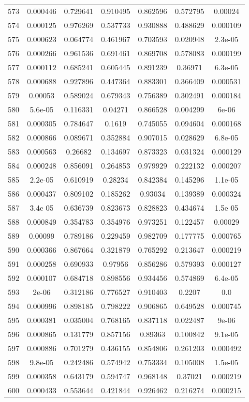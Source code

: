 \begin{table}
\begin{tabular}{c|c|c|c|c|c|c}
573 & 0.000446 & 0.729641 & 0.910495 & 0.862596 & 0.572795 & 0.00024\\
574 & 0.000125 & 0.976269 & 0.537733 & 0.930888 & 0.488629 & 0.000109\\
575 & 0.000623 & 0.064774 & 0.461967 & 0.703593 & 0.020948 & 2.3e-05\\
576 & 0.000266 & 0.961536 & 0.691461 & 0.869708 & 0.578083 & 0.000199\\
577 & 0.000112 & 0.685241 & 0.605445 & 0.891239 & 0.36971 & 6.3e-05\\
578 & 0.000688 & 0.927896 & 0.447364 & 0.883301 & 0.366409 & 0.000531\\
579 & 0.00053 & 0.589024 & 0.679343 & 0.756389 & 0.302491 & 0.000184\\
580 & 5.6e-05 & 0.116331 & 0.04271 & 0.866528 & 0.004299 & 6e-06\\
581 & 0.000305 & 0.784647 & 0.1619 & 0.745055 & 0.094604 & 0.000168\\
582 & 0.000866 & 0.089671 & 0.352884 & 0.907015 & 0.028629 & 6.8e-05\\
583 & 0.000563 & 0.26682 & 0.134697 & 0.873323 & 0.031324 & 0.000129\\
584 & 0.000248 & 0.856091 & 0.264853 & 0.979929 & 0.222132 & 0.000207\\
585 & 2.2e-05 & 0.610919 & 0.28234 & 0.842384 & 0.145296 & 1.1e-05\\
586 & 0.000437 & 0.809102 & 0.185262 & 0.93034 & 0.139389 & 0.000324\\
587 & 3.4e-05 & 0.636739 & 0.823673 & 0.828823 & 0.434674 & 1.5e-05\\
588 & 0.000849 & 0.354783 & 0.354976 & 0.973251 & 0.122457 & 0.00029\\
589 & 0.00099 & 0.789186 & 0.229459 & 0.982709 & 0.177775 & 0.000765\\
590 & 0.000366 & 0.867664 & 0.321879 & 0.765292 & 0.213647 & 0.000219\\
591 & 0.000258 & 0.690933 & 0.97956 & 0.856286 & 0.579393 & 0.000127\\
592 & 0.000107 & 0.684718 & 0.898556 & 0.934456 & 0.574869 & 6.4e-05\\
593 & 2e-06 & 0.312186 & 0.776527 & 0.910403 & 0.2207 & 0.0\\
594 & 0.000996 & 0.898185 & 0.798222 & 0.906865 & 0.649528 & 0.000745\\
595 & 0.000381 & 0.035004 & 0.768165 & 0.837118 & 0.022487 & 9e-06\\
596 & 0.000865 & 0.131779 & 0.857156 & 0.89363 & 0.100842 & 9.1e-05\\
597 & 0.000886 & 0.701279 & 0.436155 & 0.854806 & 0.261203 & 0.000492\\
598 & 9.8e-05 & 0.242486 & 0.574942 & 0.753334 & 0.105008 & 1.5e-05\\
599 & 0.000358 & 0.643179 & 0.594747 & 0.968148 & 0.37021 & 0.000219\\
600 & 0.000433 & 0.553644 & 0.421844 & 0.926462 & 0.216274 & 0.000215\\
\end{tabular}
\end{table}

